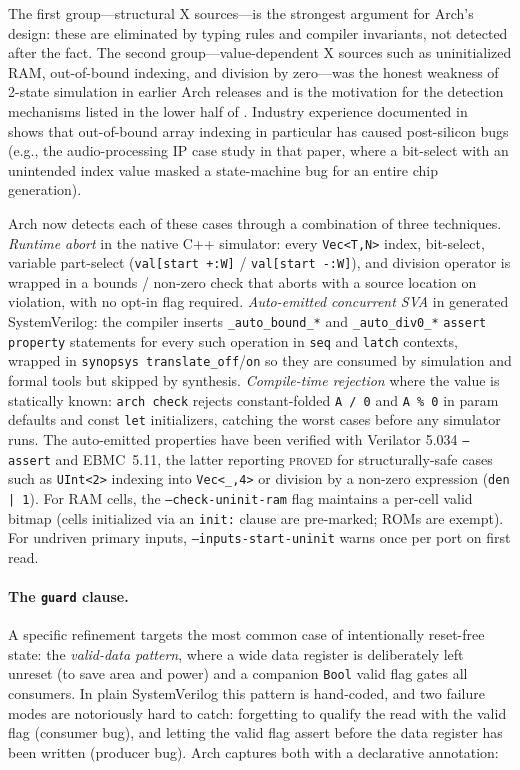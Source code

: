 \documentclass[manuscript]{acmart}
\begin{document}
The first group---structural X sources---is the strongest argument for Arch's design: these are eliminated by typing rules and compiler invariants, not detected after the fact. The second group---value-dependent X sources such as uninitialized RAM, out-of-bound indexing, and division by zero---was the honest weakness of 2-state simulation in earlier Arch releases and is the motivation for the detection mechanisms listed in the lower half of . Industry experience documented in~\cite{zhao2014xoptimism} shows that out-of-bound array indexing in particular has caused post-silicon bugs (e.g., the audio-processing IP case study in that paper, where a bit-select with an unintended index value masked a state-machine bug for an entire chip generation).

Arch now detects each of these cases through a combination of three techniques. \emph{Runtime abort} in the native C++ simulator: every \texttt{Vec<T,N>} index, bit-select, variable part-select (\texttt{val[start +:W]} / \texttt{val[start -:W]}), and division operator is wrapped in a bounds / non-zero check that aborts with a source location on violation, with no opt-in flag required. \emph{Auto-emitted concurrent SVA} in generated SystemVerilog: the compiler inserts \texttt{\_auto\_bound\_*} and \texttt{\_auto\_div0\_*} \texttt{assert property} statements for every such operation in \texttt{seq} and \texttt{latch} contexts, wrapped in \texttt{synopsys translate\_off}/\texttt{on} so they are consumed by simulation and formal tools but skipped by synthesis. \emph{Compile-time rejection} where the value is statically known: \texttt{arch check} rejects constant-folded \texttt{A / 0} and \texttt{A \% 0} in param defaults and const \texttt{let} initializers, catching the worst cases before any simulator runs. The auto-emitted properties have been verified with Verilator 5.034 \texttt{--assert} and EBMC~5.11, the latter reporting \textsc{proved} for structurally-safe cases such as \texttt{UInt<2>} indexing into \texttt{Vec<\_,4>} or division by a non-zero expression (\texttt{den | 1}). For RAM cells, the \texttt{--check-uninit-ram} flag maintains a per-cell valid bitmap (cells initialized via an \texttt{init:} clause are pre-marked; ROMs are exempt). For undriven primary inputs, \texttt{--inputs-start-uninit} warns once per port on first read.

\paragraph{The \texttt{guard} clause.}
A specific refinement targets the most common case of intentionally reset-free state: the \emph{valid-data pattern}, where a wide data register is deliberately left unreset (to save area and power) and a companion \texttt{Bool} valid flag gates all consumers. In plain SystemVerilog this pattern is hand-coded, and two failure modes are notoriously hard to catch: forgetting to qualify the read with the valid flag (consumer bug), and letting the valid flag assert before the data register has been written (producer bug). Arch captures both with a declarative annotation:
\end{document}
